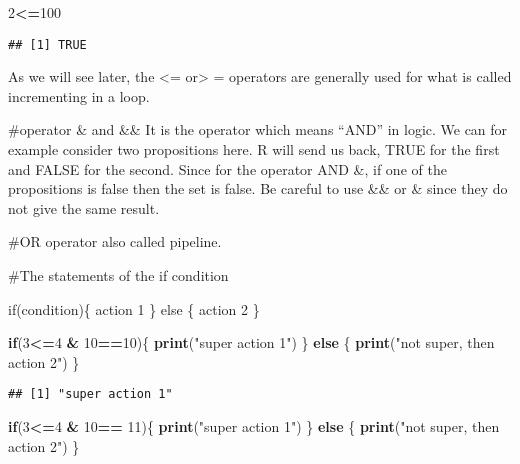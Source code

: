 \documentclass[
]{article}
\newenvironment{Shaded}{\begin{snugshade}}{\end{snugshade}}
\newcommand{\ControlFlowTok}[1]{\textcolor[rgb]{0.13,0.29,0.53}{\textbf{#1}}}
\newcommand{\DecValTok}[1]{\textcolor[rgb]{0.00,0.00,0.81}{#1}}
\newcommand{\FunctionTok}[1]{\textcolor[rgb]{0.13,0.29,0.53}{\textbf{#1}}}
\newcommand{\NormalTok}[1]{#1}
\newcommand{\SpecialCharTok}[1]{\textcolor[rgb]{0.81,0.36,0.00}{\textbf{#1}}}
\newcommand{\StringTok}[1]{\textcolor[rgb]{0.31,0.60,0.02}{#1}}
\begin{document}
\begin{Shaded}
\begin{Highlighting}[]
\DecValTok{2}\SpecialCharTok{\textless{}=}\DecValTok{100}
\end{Highlighting}
\end{Shaded}

\begin{verbatim}
## [1] TRUE
\end{verbatim}

As we will see later, the \textless= or\textgreater{} = operators are
generally used for what is called incrementing in a loop.

\#operator \& and \&\& It is the operator which means ``AND'' in logic.
We can for example consider two propositions here. R will send us back,
TRUE for the first and FALSE for the second. Since for the operator AND
\&, if one of the propositions is false then the set is false. Be
careful to use \&\& or \& since they do not give the same result.

\#OR operator \textbar{} \textbar\textbar{} also called pipeline.

\#The statements of the if condition

if(condition)\{ action 1 \} else \{ action 2 \}

\begin{Shaded}
\begin{Highlighting}[]
\ControlFlowTok{if}\NormalTok{(}\DecValTok{3}\SpecialCharTok{\textless{}=}\DecValTok{4} \SpecialCharTok{\&} \DecValTok{10}\SpecialCharTok{==}\DecValTok{10}\NormalTok{)\{}
  \FunctionTok{print}\NormalTok{(}\StringTok{"super action 1"}\NormalTok{)}
\NormalTok{\} }\ControlFlowTok{else}\NormalTok{ \{}
  \FunctionTok{print}\NormalTok{(}\StringTok{"not super, then action 2"}\NormalTok{)}
\NormalTok{\}}
\end{Highlighting}
\end{Shaded}

\begin{verbatim}
## [1] "super action 1"
\end{verbatim}

\begin{Shaded}
\begin{Highlighting}[]
\ControlFlowTok{if}\NormalTok{(}\DecValTok{3}\SpecialCharTok{\textless{}=}\DecValTok{4} \SpecialCharTok{\&} \DecValTok{10}\SpecialCharTok{==} \DecValTok{11}\NormalTok{)\{}
  \FunctionTok{print}\NormalTok{(}\StringTok{"super action 1"}\NormalTok{)}
\NormalTok{\} }\ControlFlowTok{else}\NormalTok{ \{}
  \FunctionTok{print}\NormalTok{(}\StringTok{"not super, then action 2"}\NormalTok{)}
\NormalTok{\}}
\end{Highlighting}
\end{Shaded}
\end{document}
